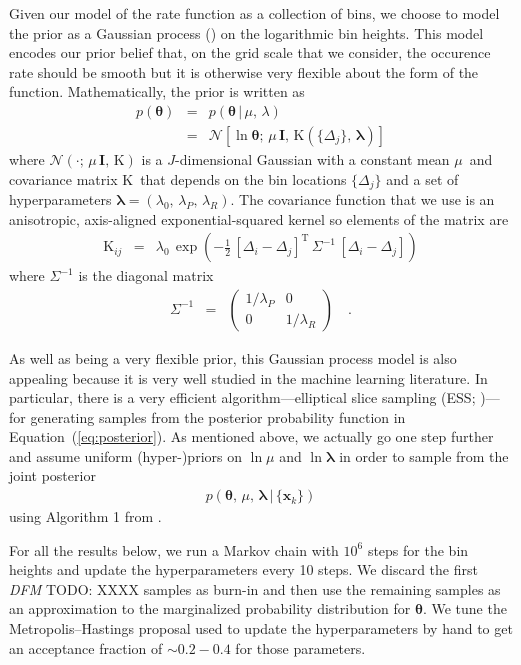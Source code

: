 \documentclass[12pt,preprint]{aastex}
\newcommand{\Eq}[1]{Equation~(\ref{eq:#1})}
\newcommand{\eq}[1]{\Eq{#1}}
\newcommand{\bvec}[1]{\ensuremath{\boldsymbol{#1}}}
\newcommand{\todo}[3]{{\color{#2} \emph{#1} TODO: #3}}
\newcommand{\dfmtodo}[1]{\todo{DFM}{red}{#1}}
\newcommand{\ratepar}{{\ensuremath{\theta}}}
\newcommand{\ratepars}{{\ensuremath{\bvec{\ratepar}}}}
\newcommand{\radius}{\ensuremath{R}}
\newcommand{\period}{\ensuremath{P}}
\newcommand{\data}{{\ensuremath{\bvec{x}}}}
\newcommand{\binarea}{{\ensuremath{\Delta}}}
\newcommand{\mean}{{\ensuremath{\mu}}}
\newcommand{\smooth}{{\ensuremath{\lambda}}}
\newcommand{\smoothpars}{{\ensuremath{\bvec{\smooth}}}}
\newcommand{\cov}{{\ensuremath{\mathrm{K}}}}
\begin{document}
Given our model of the rate function as a collection of bins, we choose to
model the prior as a Gaussian process (\citealt{gp,gibson-gp}) on the
logarithmic bin heights.
This model encodes our prior belief that, on the grid scale that we consider,
the occurence rate should be smooth but it is otherwise very flexible about
the form of the function.
Mathematically, the prior is written as
\begin{eqnarray}
p(\ratepars) &=& p(\ratepars\,|\,\mean,\,\smooth) \\
&=& \mathcal{N} \left[\ln\ratepars;\,\mean\,\bvec{I},\,
\cov(\{\binarea_j\},\,\smoothpars)\right]
\end{eqnarray}
where $\mathcal{N}(\cdot;\,\mean\,\bvec{I},\,\cov)$ is a $J$-dimensional
Gaussian with a constant mean \mean\ and covariance matrix \cov\ that depends
on the bin locations $\{\binarea_j\}$ and a set of hyperparameters
$\smoothpars = (\smooth_0,\,\smooth_\period,\,\smooth_\radius)$.
The covariance function that we use is an anisotropic, axis-aligned
exponential-squared kernel so elements of the matrix are
\begin{eqnarray}
\cov_{ij} &=& \smooth_0\,\exp\left(-\frac{1}{2}\,
    [\binarea_i-\binarea_j]^\mathrm{T}\,\Sigma^{-1}\,[\binarea_i-\binarea_j]
\right)
\end{eqnarray}
where $\Sigma^{-1}$ is the diagonal matrix
\begin{eqnarray}
\Sigma^{-1} &=& \left(\begin{array}{cc}
1/\smooth_\period & 0 \\
0 & 1/\smooth_\radius
\end{array}\right) \quad.
\end{eqnarray}

As well as being a very flexible prior, this Gaussian process model is also
appealing because it is very well studied in the machine learning literature.
In particular, there is a very efficient algorithm---elliptical slice sampling
(ESS; \citealt{ess})---for generating samples from the posterior probability
function in \eq{posterior}.
As mentioned above, we actually go one step further and assume uniform
(hyper-)priors on $\ln\mean$ and $\ln\smoothpars$ in order to sample from the
joint posterior
\begin{eqnarray}
p(\ratepars,\,\mean,\,\smoothpars\,|\,\{\data_k\})
\end{eqnarray}
using Algorithm 1 from \citet{ess-hyper}.

For all the results below, we run a Markov chain with $10^6$ steps for the bin
heights and update the hyperparameters every 10 steps.
We discard the first \dfmtodo{XXXX} samples as burn-in and then use the
remaining samples as an approximation to the marginalized probability
distribution for \ratepars.
We tune the Metropolis--Hastings proposal used to update the hyperparameters
by hand to get an acceptance fraction of $\sim0.2-0.4$ for those parameters.
\end{document}
